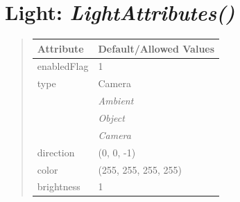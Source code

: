 \documentclass[letterpaper,10pt,english]{sphinxmanual}
\begin{document}
\begin{DUlineblock}{0em}
\item[] 
\end{DUlineblock}


\section{\textbf{Light}: \emph{LightAttributes()}}
\label{attributes:light-lightattributes}
\begin{DUlineblock}{0em}
\item[] 
\end{DUlineblock}
\begin{quote}

\begin{tabulary}{\linewidth}{|L|L|}
\hline

\textbf{Attribute}
 & 
\textbf{Default/Allowed Values}
\\
\hline
enabledFlag
 & 
1
\\
\hline
type
 & 
Camera
\\
\hline & 
\emph{Ambient}
\\
\hline & 
\emph{Object}
\\
\hline & 
\emph{Camera}
\\
\hline
direction
 & 
(0, 0, -1)
\\
\hline
color
 & 
(255, 255, 255, 255)
\\
\hline
brightness
 & 
1
\\
\hline\end{tabulary}

\end{quote}

\begin{DUlineblock}{0em}
\item[] 
\end{DUlineblock}

\begin{DUlineblock}{0em}
\item[] 
\end{DUlineblock}
\end{document}
